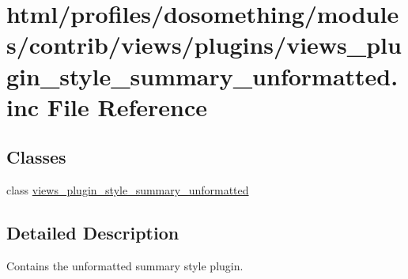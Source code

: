 \hypertarget{views__plugin__style__summary__unformatted_8inc}{
\section{html/profiles/dosomething/modules/contrib/views/plugins/views\_\-plugin\_\-style\_\-summary\_\-unformatted.inc File Reference}
\label{views__plugin__style__summary__unformatted_8inc}
}
\subsection*{Classes}
\begin{DoxyCompactItemize}
\item 
class \hyperlink{classviews__plugin__style__summary__unformatted}{views\_\-plugin\_\-style\_\-summary\_\-unformatted}
\end{DoxyCompactItemize}


\subsection{Detailed Description}
Contains the unformatted summary style plugin. 